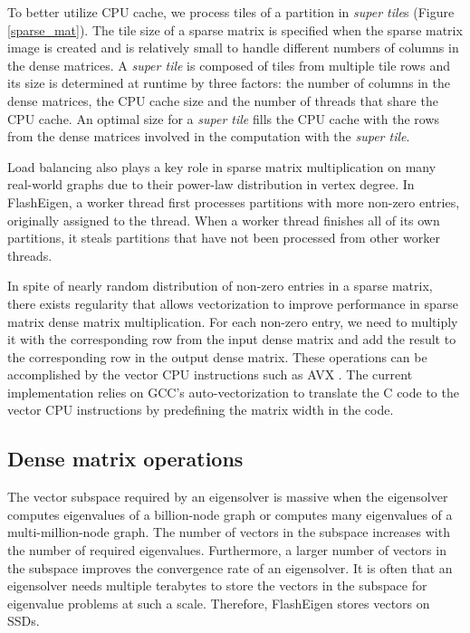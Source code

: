 To better utilize CPU cache, we process tiles of a partition in
\textit{super tile}s (Figure \ref{sparse_mat}). The tile size of a sparse
matrix is specified when the sparse matrix image is created and is relatively
small to handle different numbers of columns in the dense matrices.
A \textit{super tile} is composed of tiles from multiple tile rows and its
size is determined at runtime by three factors: the number of columns
in the dense matrices, the CPU cache size and the number of threads that
share the CPU cache. An optimal size for a \textit{super tile} fills
the CPU cache with the rows from the dense matrices involved in
the computation with the \textit{super tile}.

Load balancing also plays a key role in sparse matrix multiplication on
many real-world graphs due to their power-law distribution in vertex degree.
In FlashEigen, a worker thread first processes partitions with more non-zero
entries, originally assigned to the thread. When a worker thread finishes
all of its own partitions, it steals partitions that have not been processed
from other worker threads.

In spite of nearly random distribution of non-zero entries in a sparse matrix,
there exists regularity that allows vectorization to improve performance
in sparse matrix dense matrix multiplication. For each non-zero entry, we
need to multiply it with the corresponding row from the input dense matrix
and add the result to the corresponding row in the output dense matrix.
These operations can be accomplished by the vector CPU instructions such as
AVX \cite{avx}. The current implementation relies on GCC's auto-vectorization
to translate the C code to the vector CPU instructions by predefining the matrix
width in the code.

\subsection{Dense matrix operations}
The vector subspace required by an eigensolver is massive when the eigensolver
computes eigenvalues of a billion-node graph or computes many eigenvalues
of a multi-million-node graph. The number of vectors in the subspace
increases with the number of required eigenvalues. Furthermore, a larger
number of vectors in the subspace improves the convergence rate of an eigensolver. 
It is often that an eigensolver needs multiple terabytes to store the vectors
in the subspace for eigenvalue problems at such a scale. Therefore, FlashEigen
stores vectors on SSDs.

